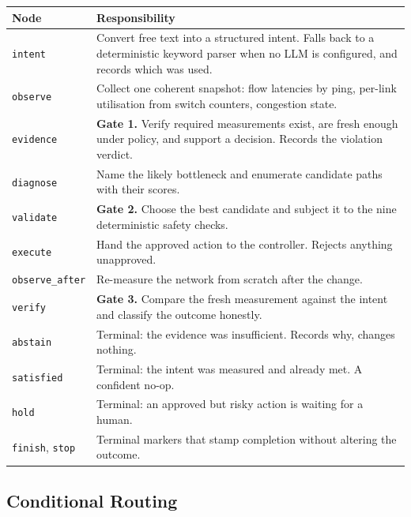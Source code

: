 \documentclass[12pt,a4paper]{report}
\begin{document}
\begin{center}
\begin{tabular}{@{}L{2.9cm}L{10.1cm}@{}}
\toprule
\textbf{Node} & \textbf{Responsibility} \\
\midrule
\texttt{intent}
  & Convert free text into a structured intent. Falls back to a deterministic
    keyword parser when no LLM is configured, and records which was used. \\
\texttt{observe}
  & Collect one coherent snapshot: flow latencies by ping, per-link utilisation
    from switch counters, congestion state. \\
\texttt{evidence}
  & \textbf{Gate 1.} Verify required measurements exist, are fresh enough under
    policy, and support a decision. Records the violation verdict. \\
\texttt{diagnose}
  & Name the likely bottleneck and enumerate candidate paths with their scores. \\
\texttt{validate}
  & \textbf{Gate 2.} Choose the best candidate and subject it to the nine
    deterministic safety checks. \\
\texttt{execute}
  & Hand the approved action to the controller. Rejects anything unapproved. \\
\texttt{observe\_after}
  & Re-measure the network from scratch after the change. \\
\texttt{verify}
  & \textbf{Gate 3.} Compare the fresh measurement against the intent and
    classify the outcome honestly. \\
\texttt{abstain}
  & Terminal: the evidence was insufficient. Records why, changes nothing. \\
\texttt{satisfied}
  & Terminal: the intent was measured and already met. A confident no-op. \\
\texttt{hold}
  & Terminal: an approved but risky action is waiting for a human. \\
\texttt{finish}, \texttt{stop}
  & Terminal markers that stamp completion without altering the outcome. \\
\bottomrule
\end{tabular}
\end{center}

\subsection{Conditional Routing}
\end{document}
